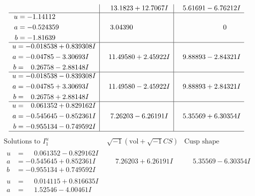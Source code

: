 \documentclass[1p]{elsarticle_modified}
\theoremstyle{definition}
\newcommand{\I}{\sqrt{-1}}
\begin{document}
$$\begin{array}{c|c|c}
 & \phantom{-}13.1823 + 12.7067 I & \phantom{-}5.61691 - 6.76212 I \\ \hline\begin{aligned}
u &= -1.14112\phantom{ +0.000000I} \\
a &= -0.524359\phantom{ +0.000000I} \\
b &= -1.81639\phantom{ +0.000000I}\end{aligned}
 & \phantom{-}3.04390\phantom{ +0.000000I} & \phantom{-0.000000 } 0 \\ \hline\begin{aligned}
u &= -0.018538 + 0.839308 I \\
a &= -0.04785 - 3.30693 I \\
b &= \phantom{-}0.26758 - 2.88148 I\end{aligned}
 & \phantom{-}11.49580 + 2.45922 I & \phantom{-}9.88893 - 2.84321 I \\ \hline\begin{aligned}
u &= -0.018538 - 0.839308 I \\
a &= -0.04785 + 3.30693 I \\
b &= \phantom{-}0.26758 + 2.88148 I\end{aligned}
 & \phantom{-}11.49580 - 2.45922 I & \phantom{-}9.88893 + 2.84321 I \\ \hline\begin{aligned}
u &= \phantom{-}0.061352 + 0.829162 I \\
a &= -0.545645 - 0.852361 I \\
b &= -0.955134 - 0.749592 I\end{aligned}
 & \phantom{-}7.26203 - 6.26191 I & \phantom{-}5.35569 + 6.30354 I\\
 \hline 
 \end{array}$$\newpage$$\begin{array}{c|c|c}  
\text{Solutions to }I^u_{1}& \I (\text{vol} + \sqrt{-1}CS) & \text{Cusp shape}\\
 \hline 
\begin{aligned}
u &= \phantom{-}0.061352 - 0.829162 I \\
a &= -0.545645 + 0.852361 I \\
b &= -0.955134 + 0.749592 I\end{aligned}
 & \phantom{-}7.26203 + 6.26191 I & \phantom{-}5.35569 - 6.30354 I \\ \hline\begin{aligned}
u &= \phantom{-}0.014115 + 0.816635 I \\
a &= \phantom{-}1.52546 - 4.00461 I \\

\end{aligned}
\end{array}$$
\end{document}
